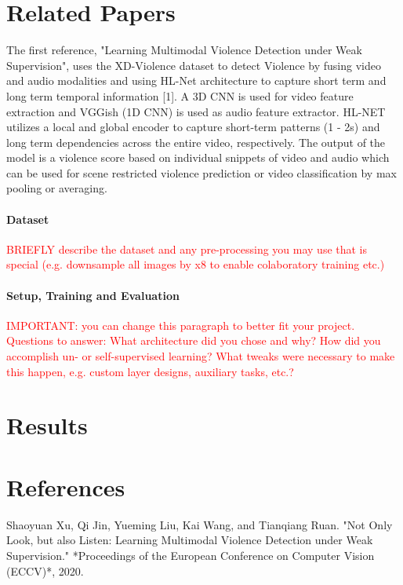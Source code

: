 \documentclass[twocolumn]{article}
\newcommand{\todo}[1]{\textcolor{red}{#1}}
\begin{document}
	\section{Related Papers}
	The first reference, "Learning Multimodal Violence Detection under Weak Supervision", uses the XD-Violence dataset to detect Violence
	by fusing video and audio modalities and using HL-Net architecture to capture short term and long term temporal information [1]. A 3D CNN 
	is used for video feature extraction and VGGish (1D CNN) is used as audio feature extractor. HL-NET utilizes a local and global encoder 
	to capture short-term patterns (1 - 2s) and long term dependencies across the entire video, respectively. The output of the model is a 
	violence score based on individual snippets of video and audio which can be used for scene restricted violence prediction or video classification
	by max pooling or averaging. 


	\paragraph{Dataset} \todo{BRIEFLY describe the dataset and any pre-processing you may use that is special (e.g. downsample all images by x8 to enable colaboratory training etc.)}
	
	\paragraph{Setup, Training and Evaluation} \todo{IMPORTANT: you can change this paragraph to better fit your project. Questions to answer: What architecture did you chose and why? How did you accomplish un- or self-supervised learning? What tweaks were necessary to make this happen, e.g. custom layer designs, auxiliary tasks, etc.?}
	
	
	
	\section{Results}
	
	
	\section{References} 
	\begin{thebibliography}{9}
		Shaoyuan Xu, Qi Jin, Yueming Liu, Kai Wang, and Tianqiang Ruan. "Not Only Look, but also Listen: Learning Multimodal Violence Detection under Weak Supervision." *Proceedings of the European Conference on Computer Vision (ECCV)*, 2020.

		\end{thebibliography}
\end{document}
